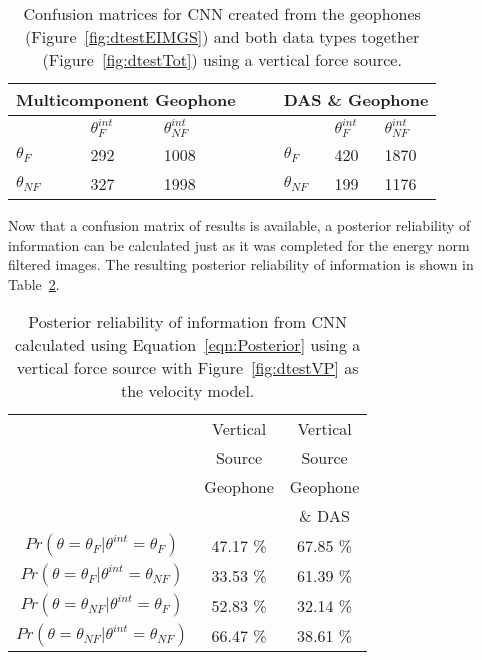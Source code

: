 \begin{table}[]
\centering
\caption{Confusion matrices for CNN created from the geophones (Figure~\ref{fig:dtestEIMGS}) and both data types together (Figure~\ref{fig:dtestTot}) using a vertical force source.}
\label{table:CNNResults-dtest}
\setlength{\tabcolsep}{1em}
\begin{tabular}{|l|l|l|ll|l|l|l|}
  \multicolumn{3}{c}{Multicomponent Geophone} & \multicolumn{2}{c}{ } &\multicolumn{3}{c}{DAS \& Geophone}\\
  \hline
  & $\theta_F^{int}$ & $\theta_{NF}^{int}$ & & & &$\theta_F^{int}$ & $\theta_{NF}^{int}$ \\
\hline
$\theta_F$  & 292 & 1008 & & & $\theta_F$   & 420 & 1870\\
\hline
$\theta_{NF}$ & 327 & 1998 & & & $\theta_{NF}$ & 199 & 1176 \\
\hline
\end{tabular}
\end{table}

Now that a confusion matrix of results is available, a posterior reliability of information can be calculated just as it was completed for the energy norm filtered images. The resulting posterior reliability of information is shown in Table~\ref{table:POSTERIORS-vSource-CNN}.

\begin{table}[]
\centering
\caption{Posterior reliability of information from CNN calculated using Equation~\ref{eqn:Posterior} using a vertical force source with Figure~\ref{fig:dtestVP} as the velocity model.}
\label{table:POSTERIORS-vSource-CNN}
\setlength{\tabcolsep}{1em}
\begin{tabular}{|c|c|c|}
  \hline
  &  Vertical  & Vertical  \\
  &  Source &  Source   \\
  &  Geophone      & Geophone  \\
  &                   &   \& DAS \\
  \hline
  $Pr(\theta=\theta_F | \theta^{int}=\theta_F)$ &   47.17 \% & 67.85  \%\\
  \hline
  $Pr(\theta=\theta_F | \theta^{int}=\theta_{NF})$ &  33.53 \% & 61.39 \%  \\
  \hline
  $Pr(\theta=\theta_{NF} | \theta^{int}=\theta_F)$ &  52.83 \% &  32.14 \%  \\
  \hline
  $Pr(\theta=\theta_{NF} | \theta^{int}=\theta_{NF})$ & 66.47 \% & 38.61 \% \\
  \hline
\end{tabular}
\end{table}

